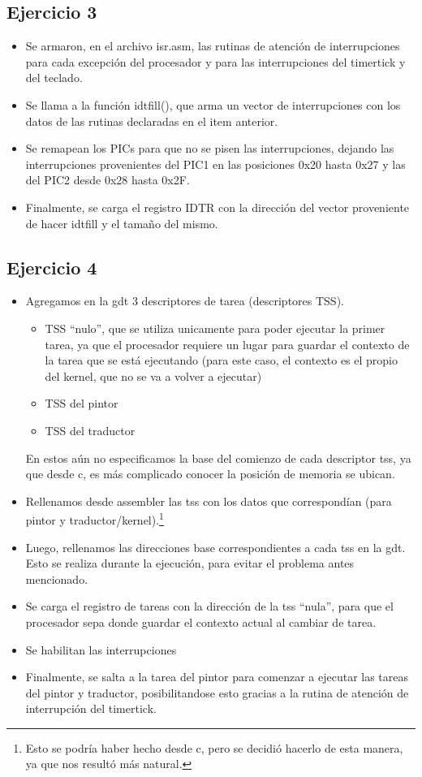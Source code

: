 \subsection{Ejercicio 3}
\begin{itemize}
 \item Se armaron, en el archivo isr.asm, las rutinas de atenci\'on de interrupciones para cada excepci\'on del procesador y para las interrupciones del timertick y del teclado.
 \item Se llama a la funci\'on idtfill(), que arma un vector de interrupciones con los datos de las rutinas declaradas en el item anterior.
 \item Se remapean los PICs para que no se pisen las interrupciones, dejando las interrupciones provenientes del PIC1 en las posiciones 0x20 hasta 0x27 y las del PIC2 desde 0x28 hasta 0x2F.
 \item Finalmente, se carga el registro IDTR con la direcci\'on del vector proveniente de hacer idtfill y el tama\~no del mismo.
\end{itemize}


\subsection{Ejercicio 4}
\begin{itemize}
 \item Agregamos en la gdt 3 descriptores de tarea (descriptores TSS).
	\begin{itemize}
 		\item TSS ``nulo'', que se utiliza unicamente para poder ejecutar la primer tarea, ya que el procesador requiere un lugar para guardar el contexto de la tarea que se est\'a ejecutando (para este caso, el contexto es el propio del kernel, que no se va a volver a ejecutar)
		\item TSS del pintor
		\item TSS del traductor
	\end{itemize}
	En estos a\'un no especificamos la base del comienzo de cada descriptor tss, ya que desde c, es m\'as complicado conocer la posici\'on de memoria se ubican.

 \item Rellenamos desde assembler las tss con los datos que correspond\'ian (para pintor y traductor/kernel).\footnote{Esto se podr\'ia haber hecho desde c, pero se decidi\'o hacerlo de esta manera, ya que nos result\'o m\'as natural.}
 \item Luego, rellenamos las direcciones base correspondientes a cada tss en la gdt. Esto se realiza durante la ejecuci\'on, para evitar el problema antes mencionado.
 \item Se carga el registro de tareas con la direcci\'on de la tss ``nula'', para que el procesador sepa donde guardar el contexto actual al cambiar de tarea.
 \item Se habilitan las interrupciones
 \item Finalmente, se salta a la tarea del pintor para comenzar a ejecutar las tareas del pintor y traductor, posibilitandose esto gracias a la rutina de atenci\'on de interrupci\'on del timertick.
\end{itemize}

